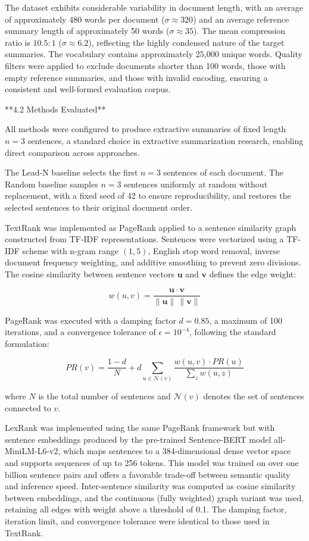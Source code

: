 \documentclass[10pt]{book}
\begin{document}
The dataset exhibits considerable variability in document length, with an average of approximately 480 words per document ($\sigma \approx 320$) and an average reference summary length of approximately 50 words ($\sigma \approx 35$). The mean compression ratio is $10.5:1$ ($\sigma \approx 6.2$), reflecting the highly condensed nature of the target summaries. The vocabulary contains approximately 25,000 unique words. Quality filters were applied to exclude documents shorter than 100 words, those with empty reference summaries, and those with invalid encoding, ensuring a consistent and well-formed evaluation corpus.

**4.2 Methods Evaluated**

All methods were configured to produce extractive summaries of fixed length $n = 3$ sentences, a standard choice in extractive summarization research, enabling direct comparison across approaches.

The Lead-N baseline selects the first $n = 3$ sentences of each document. The Random baseline samples $n = 3$ sentences uniformly at random without replacement, with a fixed seed of 42 to ensure reproducibility, and restores the selected sentences to their original document order.

TextRank was implemented as PageRank applied to a sentence similarity graph constructed from TF-IDF representations. Sentences were vectorized using a TF-IDF scheme with n-gram range $(1, 5)$, English stop word removal, inverse document frequency weighting, and additive smoothing to prevent zero divisions. The cosine similarity between sentence vectors $\mathbf{u}$ and $\mathbf{v}$ defines the edge weight:

$$w(u, v) = \frac{\mathbf{u} \cdot \mathbf{v}}{\|\mathbf{u}\| \, \|\mathbf{v}\|}$$

PageRank was executed with a damping factor $d = 0.85$, a maximum of 100 iterations, and a convergence tolerance of $\epsilon = 10^{-4}$, following the standard formulation:

$$PR(v) = \frac{1 - d}{N} + d \sum_{u \in \mathcal{N}(v)} \frac{w(u,v) \cdot PR(u)}{\sum_{z} w(u,z)}$$

where $N$ is the total number of sentences and $\mathcal{N}(v)$ denotes the set of sentences connected to $v$.

LexRank was implemented using the same PageRank framework but with sentence embeddings produced by the pre-trained Sentence-BERT model all-MiniLM-L6-v2, which maps sentences to a 384-dimensional dense vector space and supports sequences of up to 256 tokens. This model was trained on over one billion sentence pairs and offers a favorable trade-off between semantic quality and inference speed. Inter-sentence similarity was computed as cosine similarity between embeddings, and the continuous (fully weighted) graph variant was used, retaining all edges with weight above a threshold of 0.1. The damping factor, iteration limit, and convergence tolerance were identical to those used in TextRank.
\end{document}
